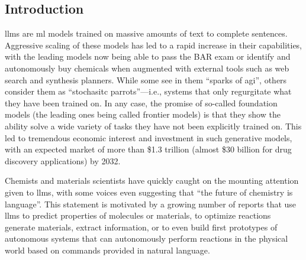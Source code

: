 \documentclass[11pt, oneside]{article}
\begin{document}
\clearpage
\begin{refsection}
\section{Introduction}
\Glspl{llm} are \gls{ml} models trained on massive amounts of text to complete sentences. 
Aggressive scaling of these models has led to a rapid increase in their capabilities,\autocite{brown2020language,zhong2024benchmarking} with the leading models now being able to pass the BAR exam or identify and autonomously buy chemicals when augmented with external tools such as web search and synthesis planners.\autocite{openai2024gpt4}
While some see in them \enquote{sparks of \gls{agi}},\autocite{bubeck2023sparks} others consider them as \enquote{stochasitc parrots}---i.e., systems that only regurgitate what they have been trained on.\autocite{bender2021dangers}
In any case, the promise of so-called foundation models (the leading ones being called frontier models) is that they show the ability solve a wide variety of tasks they have not been explicitly trained on.\autocite{bommasani2021opportunities, anderljung2023frontier}
This led to tremendous economic interest and investment in such generative models, with an expected market of more than \$1.3 trillion (almost \$30 billion for drug discovery applications) by 2032.\autocite{bloomberg}

Chemists and materials scientists have quickly caught on the mounting attention given to \glspl{llm}, with some voices even suggesting that \enquote{the future of chemistry is language}.\autocite{White_2023}
This statement is motivated by a growing number of reports that use \glspl{llm} to predict properties of molecules or materials,\autocite{jablonka202314, jablonka2024leveraging, xie2024fine, liao2024words, zhang2024chemllm, zhong2024benchmarking} to optimize reactions\autocite{ramos2023bayesian, kristiadi2024sober}  generate materials,\autocite{rubungo2023llm, flam2023language, gruver2024fine} extract information,\autocite{Patiny_2023, Dagdelen_2024, Zheng_2024, lála2023paperqa, caufield2023structured} or to even build first prototypes of autonomous systems that can autonomously perform reactions in the physical world based on commands provided in natural language.\autocite{bran2023chemcrow, Boiko_2023, darvish2024organa}


\end{refsection}
\end{document}
